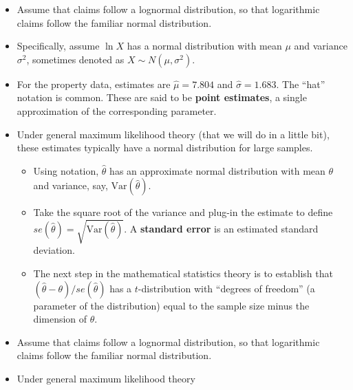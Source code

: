 \documentclass[]{book}
\begin{document}
\begin{itemize}
\item
  Assume that claims follow a lognormal distribution, so that
  logarithmic claims follow the familiar normal distribution.
\item
  Specifically, assume \(\ln X\) has a normal distribution with mean
  \(\mu\) and variance \(\sigma^2\), sometimes denoted as
  \(X \sim N(\mu, \sigma^2)\).
\item
  For the property data, estimates are \(\hat{\mu} =7.804\) and
  \(\hat{\sigma} = 1.683\). The ``hat'' notation is common. These are
  said to be \textbf{point estimates}, a single approximation of the
  corresponding parameter.
\item
  Under general maximum likelihood theory (that we will do in a little
  bit), these estimates typically have a normal distribution for large
  samples.

  \begin{itemize}
  \item
    Using notation, \(\hat{\theta}\) has an approximate normal
    distribution with mean \(\theta\) and variance, say,
    \(\mathrm{Var}(\hat{\theta})\).
  \item
    Take the square root of the variance and plug-in the estimate to
    define \(se(\hat{\theta}) = \sqrt{\mathrm{Var}(\hat{\theta})}\). A
    \textbf{standard error} is an estimated standard deviation.
  \item
    The next step in the mathematical statistics theory is to establish
    that \((\hat{\theta}-\theta)/se(\hat{\theta})\) has a
    \(t\)-distribution with ``degrees of freedom'' (a parameter of the
    distribution) equal to the sample size minus the dimension of
    \(\theta\).
  \end{itemize}
\item
  Assume that claims follow a lognormal distribution, so that
  logarithmic claims follow the familiar normal distribution.
\item
  Under general maximum likelihood theory


\end{itemize}
\end{document}
